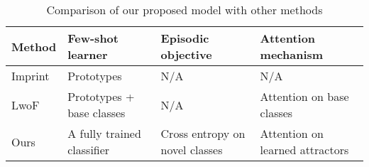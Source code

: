 \begin{table}
\centering
\caption{Comparison of our proposed model with other methods}
\renewcommand{\arraystretch}{1.2}
\label{}
\begin{small}
\begin{tabular}{lp{3.2cm}p{2.5cm}p{3.8cm}}
\toprule
Method           & Few-shot learner     & Episodic objective      & Attention mechanism \\
\midrule
Imprint 
\citep{qi2018imprinting}         
                 & Prototypes          & N/A                     & N/A                \\
\hline
LwoF \citep{lwof} & Prototypes + base classes & N/A         & Attention on base classes      \\
\hline
Ours             & A fully trained classifier & Cross entropy on novel classes & Attention on learned attractors \\
\bottomrule
\end{tabular}
\end{small}
\end{table}